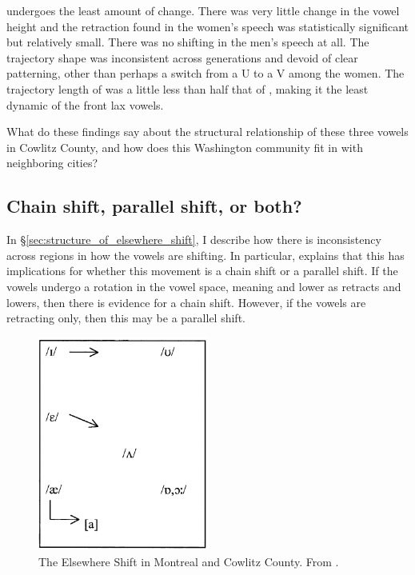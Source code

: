 \bit undergoes the least amount of change. There was very little change in the vowel height and the retraction found in the women's speech was statistically significant but relatively small. There was no shifting in the men's speech at all. The trajectory shape was inconsistent across generations and devoid of clear patterning, other than perhaps a switch from a U to a V among the women. The trajectory length of \bit was a little less than half that of \bat, making it the least dynamic of the front lax vowels.

What do these findings say about the structural relationship of these three vowels in Cowlitz County, and how does this Washington community fit in with neighboring cities?

\subsection{Chain shift, parallel shift, or both?}
\label{sec:what_kind_of_shift}

In \S\ref{sec:structure_of_elsewhere_shift}, I describe how there is inconsistency across regions in how the vowels are shifting. In particular, \citet{boberg_2005} explains that this has implications for whether this movement is a chain shift or a parallel shift. If the vowels undergo a rotation in the vowel space, meaning \bet and \bit lower as \bat retracts and lowers, then there is evidence for a chain shift. However, if the vowels are retracting only, then this may be a parallel shift.

\begin{figure}[tb!]
    \centering
    \includegraphics[width = 0.5\textwidth]{Figures/other_figures/montreal_shift.pdf}
    \caption[The Elsewhere Shift in Montreal and Cowlitz County.]{The Elsewhere Shift in Montreal and Cowlitz County. From \citet[149]{boberg_2005}.}
    \label{fig:montreal_shift}
\end{figure}

